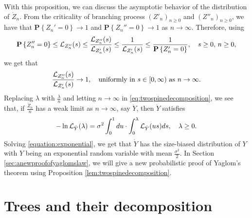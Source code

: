 \documentclass[12pt]{amsart}
\numberwithin{equation}{section}
\newcommand{\prob}{\mathbf P}
\newcommand{\set}[1]{\left\{ #1 \right\}}
\newcommand{\uniformly}{\text{uniformly in }}
\begin{document}
\par
	With this proposition, we can discuss the asymptotic behavior of the distribution of $\dot Z_n$.
	From the criticality of branching process $(Z'_n)_{n\ge 0}$ and $(Z''_n)_{n\ge 0}$, we have that $\prob\set{Z_n'=0}\to 1$ and $\prob\set{Z_n''=0}\to 1$ as $n\to\infty$.
	Therefore, using
\begin{equation*}
		\prob\set{Z_n''=0}
	\leq
		\cL_{Z_n''}(s)
	\leq
		\frac{\cL_{Z_n''}(s)}{\cL_{Z_n'}(s)}
	\leq
		\frac{1}{\cL_{Z_n'}(s)}
	\leq
		\frac{1}{\prob \set{Z_n'=0}},
	\quad
		s\geq 0,\, n\ge 0,
\end{equation*}
	we get that
\begin{equation}
\label{eq:uniformly}
	    \frac{\cL_{Z_n''}(s)}{\cL_{Z_n'}(s)}
	\to
	    1,
	\quad
				\uniformly s\in [0,\infty)\text{ as } n\to\infty.
\end{equation}
	Replacing $\lambda$ with $\frac{\lambda}{n}$ and letting $n\to\infty$ in \eqref{eq:twospinedecomposition},
    we see that, if $\frac{\dot Z_n}{n}$ has a weak limit as $n\to\infty$, say $\dot Y$, then $\dot Y$ satisfies
\begin{equation}
\label{equation:exponential}
		-\ln \mathcal L_{\dot Y}(\lambda)
	=
		\sigma^2\int_0^1du\cdot\int_0^\lambda \mathcal L_{\dot Y}(us)ds,
	\quad\lambda \geq 0.
\end{equation}
	Solving \eqref{equation:exponential}, we get that $\dot Y$ has the size-biased distribution of $Y$
with $Y$ being an exponential random variable with mean $\frac{\sigma^2}{2}$.
In Section \ref{sec:anewproofofyaglomslaw}, we will give a new probabilistic proof of Yaglom's theorem using Proposition \ref{lem:twospinedecomposition}.
\section{Trees and their decomposition}
\label{sec:preliminary}
\end{document}
